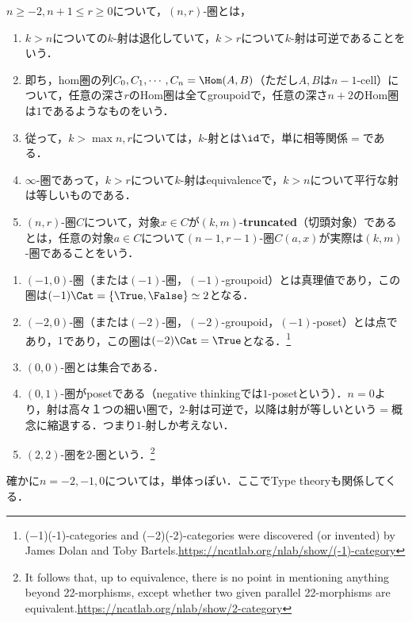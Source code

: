 \documentclass[uplatex,dvipdfmx]{jsreport}
\begin{document}
\begin{definition}
    $n\ge -2,n+1\le r\ge 0$について，$(n,r)$-圏とは，
    \begin{enumerate}
        \item $k>n$についての$k$-射は退化していて，$k>r$について$k$-射は可逆であることをいう．
        \item 即ち，hom圏の列$C_0,C_1,\cdots,C_n=\Hom(A,B)$（ただし$A,B$は$n-1$-cell）について，任意の深さ$r$のHom圏は全てgroupoidで，任意の深さ$n+2$のHom圏は$1$であるようなものをいう．
        \item 従って，$k>\max{n,r}$については，$k$-射とは$\id$で，単に相等関係$=$である．
        \item $\infty$-圏であって，$k>r$について$k$-射はequivalenceで，$k>n$について平行な射は等しいものである．
        \item $(n,r)$-圏$C$について，対象$x\in C$が$(k,m)$-\textbf{truncated}（切頭対象）であるとは，任意の対象$a\in C$について$(n-1,r-1)$-圏$C(a,x)$が実際は$(k,m)$-圏であることをいう．
    \end{enumerate}
\end{definition}
\begin{example}\mbox{}
    \begin{enumerate}
        \item $(-1,0)$-圏（または$(-1)$-圏，$(-1)$-groupoid）とは真理値であり，この圏は$(-1)\Cat=\{\True,\False\}\simeq 2$となる．
        \item $(-2,0)$-圏（または$(-2)$-圏，$(-2)$-groupoid，$(-1)$-poset）とは点であり，$1$であり，この圏は$(-2)\Cat=\True$となる．\footnote{(−1)(-1)-categories and (−2)(-2)-categories were discovered (or invented) by James Dolan and Toby Bartels.\url{https://ncatlab.org/nlab/show/(-1)-category}}
        \item $(0,0)$-圏とは集合である．
        \item $(0,1)$-圏がposetである（negative thinkingでは$1$-posetという）．$n=0$より，射は高々１つの細い圏で，$2$-射は可逆で，以降は射が等しいという$=$概念に縮退する．つまり$1$-射しか考えない．
        \item $(2,2)$-圏を$2$-圏という．\footnote{It follows that, up to equivalence, there is no point in mentioning anything beyond 22-morphisms, except whether two given parallel 22-morphisms are equivalent.\url{https://ncatlab.org/nlab/show/2-category}}
    \end{enumerate}
    確かに$n=-2,-1,0$については，単体っぽい．ここでType theoryも関係してくる．
\end{example}
\end{document}
